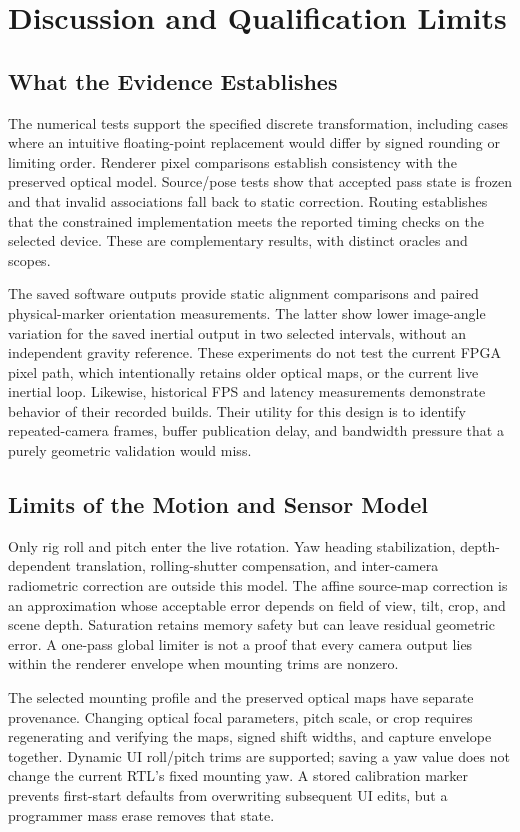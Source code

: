 \section{Discussion and Qualification Limits}
\label{sec:discussion}
\subsection{What the Evidence Establishes}
The numerical tests support the specified discrete transformation, including cases where an intuitive floating-point replacement would differ by signed rounding or limiting order. Renderer pixel comparisons establish consistency with the preserved optical model. Source/pose tests show that accepted pass state is frozen and that invalid associations fall back to static correction. Routing establishes that the constrained implementation meets the reported timing checks on the selected device. These are complementary results, with distinct oracles and scopes.

The saved software outputs provide static alignment comparisons and paired physical-marker orientation measurements. The latter show lower image-angle variation for the saved inertial output in two selected intervals, without an independent gravity reference. These experiments do not test the current FPGA pixel path, which intentionally retains older optical maps, or the current live inertial loop. Likewise, historical FPS and latency measurements demonstrate behavior of their recorded builds. Their utility for this design is to identify repeated-camera frames, buffer publication delay, and bandwidth pressure that a purely geometric validation would miss.

\subsection{Limits of the Motion and Sensor Model}
Only rig roll and pitch enter the live rotation. Yaw heading stabilization, depth-dependent translation, rolling-shutter compensation, and inter-camera radiometric correction are outside this model. The affine source-map correction is an approximation whose acceptable error depends on field of view, tilt, crop, and scene depth. Saturation retains memory safety but can leave residual geometric error. A one-pass global limiter is not a proof that every camera output lies within the renderer envelope when mounting trims are nonzero.

The selected mounting profile and the preserved optical maps have separate provenance. Changing optical focal parameters, pitch scale, or crop requires regenerating and verifying the maps, signed shift widths, and capture envelope together. Dynamic UI roll/pitch trims are supported; saving a yaw value does not change the current RTL's fixed mounting yaw. A stored calibration marker prevents first-start defaults from overwriting subsequent UI edits, but a programmer mass erase removes that state.

